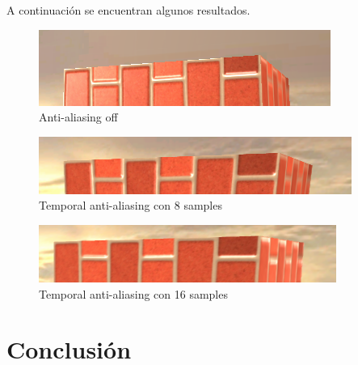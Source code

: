 \documentclass[withindex, glossary]{cam-thesis}
\begin{document}
A continuación se encuentran algunos resultados.

\begin{figure}[!htb]
    \includegraphics[width=\linewidth]{figures/taaoff.png}
    \caption{Anti-aliasing off}
    \label{aaoff}
\end{figure}

\begin{figure}[!htb]
    \includegraphics[width=\linewidth]{figures/taa8.png}
    \caption{Temporal anti-aliasing con 8 samples}
    \label{taa8}
\end{figure}

\begin{figure}[!htb]
    \includegraphics[width=\linewidth]{figures/taa16.png}
    \caption{Temporal anti-aliasing con 16 samples}
    \label{taa16}
\end{figure}

\chapter{Conclusión}

\nocite{*}
\printbibliography{}

\listoffigures
\listoftables

\printthesisindex{}
\end{document}
